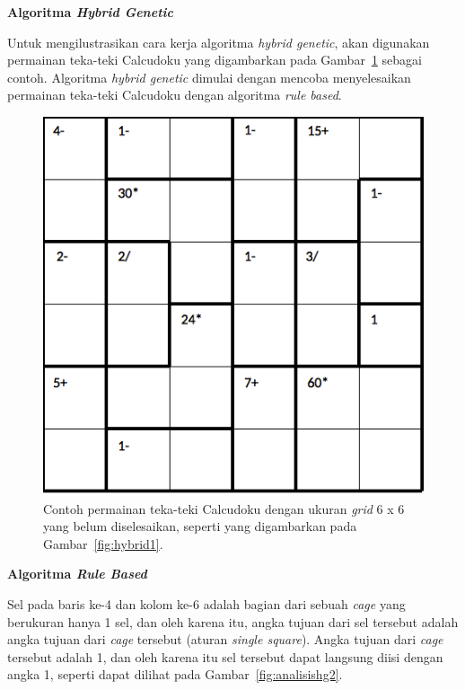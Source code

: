 \documentclass[a4paper,twoside]{article}
\begin{document}
\begin{enumerate}
\textbf{Algoritma \textit{Hybrid Genetic}}

Untuk mengilustrasikan cara kerja algoritma \textit{hybrid genetic}, akan digunakan permainan teka-teki Calcudoku yang digambarkan pada Gambar~\ref{fig:analisishg1} sebagai contoh. Algoritma \textit{hybrid genetic} dimulai dengan mencoba menyelesaikan permainan teka-teki Calcudoku dengan algoritma \textit{rule based}.

\begin{figure}
\centering
\captionsetup{justification=centering}
\includegraphics[scale=0.333]{Gambar/hybridgenetic/Puzzle}
\caption[Contoh permainan teka-teki Calcudoku dengan ukuran \textit{grid} 6 x 6 yang belum diselesaikan, seperti yang digambarkan pada Gambar~\ref{fig:hybrid1}. \cite{JohannaLukasSaputra}]{Contoh permainan teka-teki Calcudoku dengan ukuran \textit{grid} 6 x 6 yang belum diselesaikan, seperti yang digambarkan pada Gambar~\ref{fig:hybrid1}. \cite{JohannaLukasSaputra}}
\label{fig:analisishg1}
\end{figure}

\textbf{Algoritma \textit{Rule Based}}

Sel pada baris ke-4 dan kolom ke-6 adalah bagian dari sebuah \textit{cage} yang berukuran hanya 1 sel, dan oleh karena itu, angka tujuan dari sel tersebut adalah angka tujuan dari \textit{cage} tersebut (aturan \textit{single square}). Angka tujuan dari \textit{cage} tersebut adalah 1, dan oleh karena itu sel tersebut dapat langsung diisi dengan angka 1, seperti dapat dilihat pada Gambar~\ref{fig:analisishg2}.


\end{enumerate}
\end{document}
